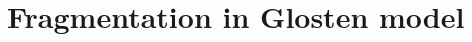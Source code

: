 \documentclass[english,10pt
,aspectratio=169
]{beamer}
\begin{document}
\section{Fragmentation in Glosten model}

%
%
\end{document}

